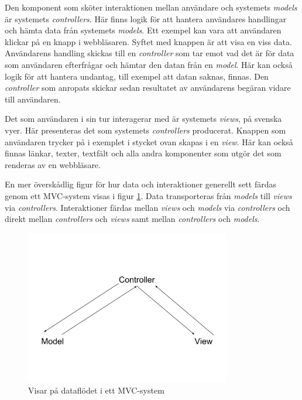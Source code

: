 \documentclass[a4paper,12pt,oneside,final]{extbook}
\begin{document}
Den komponent som sköter interaktionen mellan användare och systemets \textit{models} är systemets \textit{controllers}. Här finns logik för att hantera användares handlingar och hämta data från systemets \textit{models}. Ett exempel kan vara att användaren klickar på en knapp i webbläsaren. Syftet med knappen är att visa en viss data. Användarens handling skickas till en \textit{controller} som tar emot vad det är för data som användaren efterfrågar och hämtar den datan från en \textit{model}. Här kan också logik för att hantera undantag, till exempel att datan saknas, finnas. Den \textit{controller} som anropats skickar sedan resultatet av användarens begäran vidare till användaren.

Det som användaren i sin tur interagerar med är systemets \textit{views}, på svenska vyer. Här presenteras det som systemets \textit{controllers} producerat. Knappen som användaren trycker på i exemplet i stycket ovan skapas i en \textit{view}. Här kan också finnas länkar, texter, textfält och alla andra komponenter som utgör det som renderas av en webbläsare.

En mer överskådlig figur för hur data och interaktioner generellt sett färdas genom ett MVC-system visas i figur \ref{fig:mvc1}. Data transporteras från \textit{models} till \textit{views} via \textit{controllers}. Interaktioner färdas mellan \textit{views} och \textit{models} via \textit{controllers} och direkt mellan \textit{controllers} och \textit{views} samt mellan \textit{controllers} och \textit{models}.

\begin{figure}[h]
\centering
\includegraphics[width=0.8\textwidth]{figures/mvc1.png}
\caption{Visar på dataflödet i ett MVC-system}
\label{fig:mvc1}
\end{figure}
\end{document}
